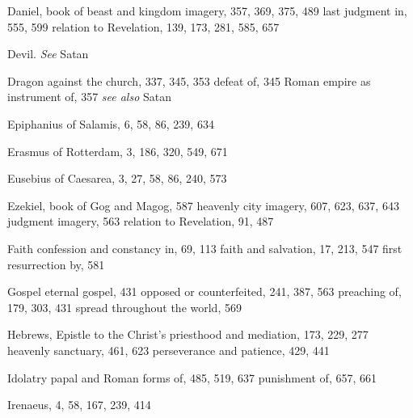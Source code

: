 \begin{theindex}
\indexspace

\item Daniel, book of
\subitem beast and kingdom imagery, 357, 369, 375, 489
\subitem last judgment in, 555, 599
\subitem relation to Revelation, 139, 173, 281, 585, 657
\item Devil. \emph{See} Satan
\item Dragon
\subitem against the church, 337, 345, 353
\subitem defeat of, 345
\subitem Roman empire as instrument of, 357
\subitem \emph{see also} Satan

\indexspace

\item Epiphanius of Salamis, 6, 58, 86, 239, 634
\item Erasmus of Rotterdam, 3, 186, 320, 549, 671
\item Eusebius of Caesarea, 3, 27, 58, 86, 240, 573
\item Ezekiel, book of
\subitem Gog and Magog, 587
\subitem heavenly city imagery, 607, 623, 637, 643
\subitem judgment imagery, 563
\subitem relation to Revelation, 91, 487

\indexspace

\item Faith
\subitem confession and constancy in, 69, 113
\subitem faith and salvation, 17, 213, 547
\subitem first resurrection by, 581

\indexspace

\item Gospel
\subitem eternal gospel, 431
\subitem opposed or counterfeited, 241, 387, 563
\subitem preaching of, 179, 303, 431
\subitem spread throughout the world, 569

\indexspace

\item Hebrews, Epistle to the
\subitem Christ's priesthood and mediation, 173, 229, 277
\subitem heavenly sanctuary, 461, 623
\subitem perseverance and patience, 429, 441

\indexspace

\item Idolatry
\subitem papal and Roman forms of, 485, 519, 637
\subitem punishment of, 657, 661
\item Irenaeus, 4, 58, 167, 239, 414

\indexspace


\end{theindex}
